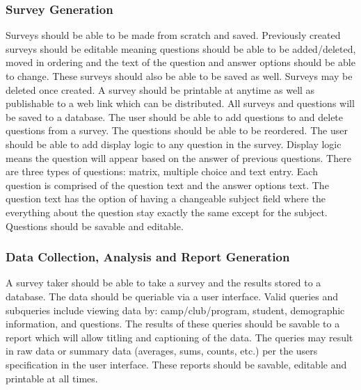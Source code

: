 \documentclass[letterpaper,10pt,titlepage, draftclsnofoot,onecolumn]{IEEEtran}
\begin{document}
\subsubsection{Survey Generation}
Surveys should be able to be made from scratch and saved. Previously created surveys should be editable 
meaning questions should be able to be added/deleted, moved in ordering and the text of the question 
and answer options should be able to change. These surveys should also be able to be saved as well. 
Surveys may be deleted once created. A survey should be printable at anytime as well as publishable to a
web link which can be distributed. All surveys and questions will be saved to a database.
The user should be able to add questions to and delete questions from a survey. The questions should be able to
be reordered. The user should be able to add display logic to any question in the survey. Display logic means the
question will appear based on the answer of previous questions.
There are three types of questions: matrix, multiple choice and text entry. Each question is comprised of the 
question text and the answer options text. The question text has the option of having a changeable subject
field where the everything about the question stay exactly the same except for the subject. Questions should
be savable and editable. \\

\subsubsection{Data Collection, Analysis and Report Generation}
A survey taker should be able to take a survey and the results stored to a database. The data should be queriable
via a user interface. Valid queries and subqueries include viewing data by: camp/club/program, student, demographic 
information, and questions. The results of these queries should be savable to a report which will allow titling and captioning 
of the data. The queries may result in raw data or summary data (averages, sums, counts, etc.) per the users specification 
in the user interface. These reports should be savable, editable and printable at all times. 
\end{document}
